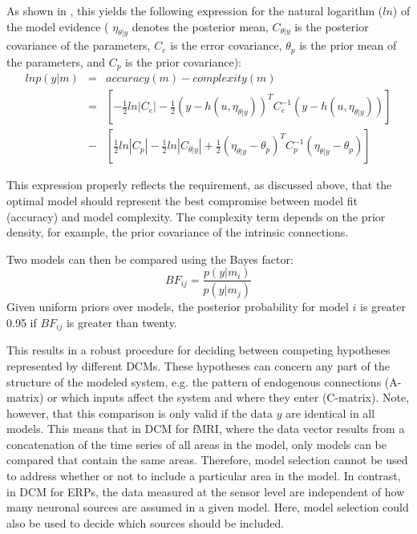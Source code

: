 As shown in \cite{cdcm}, this yields the following expression for the natural logarithm ($ln$) of the model evidence ( $\eta_{\theta | y}$ denotes the posterior mean, $C_{\theta | y}$ is the posterior covariance of the parameters, $C_e$  is the error covariance, $\theta_p$ is the prior mean of the parameters, and $C_p$ is the prior covariance):
\begin{eqnarray}
ln p(y|m) & = & accuracy(m) - complexity (m) \\ \nonumber
& = & \left[ -\frac{1}{2} ln |C_e| - \frac{1}{2} (y-h(u,\eta_{\theta | y}))^T C_e^{-1} (y-h(u,\eta_{\theta | y}))\right] \\ \nonumber
& - & \left[ \frac{1}{2} ln |C_p| -\frac{1}{2}ln |C_{\theta | y}| + \frac{1}{2} (\eta_{\theta | y}-\theta_p)^T C_p^{-1} (\eta_{\theta | y}-\theta_p) \right]
\end{eqnarray}

This expression properly reflects the requirement, as discussed above, that the optimal model should represent the best compromise between model fit (accuracy) and model complexity.  The complexity term depends on the prior density, for example, the prior covariance of the intrinsic connections.  

Two models can then be compared using the Bayes factor:
\begin{equation}
BF_{ij} = \frac{p(y|m_i)}{p(y|m_j)}
\end{equation}
Given uniform priors over models, the posterior probability for model $i$ is greater 0.95 if $BF_{ij}$ is greater than twenty.

This results in a robust procedure for deciding between competing hypotheses represented by different DCMs. These hypotheses can concern any part of the structure of the modeled system, e.g. the pattern of endogenous connections (A-matrix) or which inputs affect the system and where they enter (C-matrix). Note, however, that this comparison is only valid if the data $y$ are identical in all models.  This means that in DCM for fMRI, where the data vector results from a concatenation of the time series of all areas in the model, only models can be compared that contain the same areas. Therefore, model selection cannot be used to address whether or not to include a particular area in the model.  In contrast, in DCM for ERPs, the data measured at the sensor level are independent of how many neuronal sources are assumed in a given model.  Here, model selection could also be used to decide which sources should be included.

